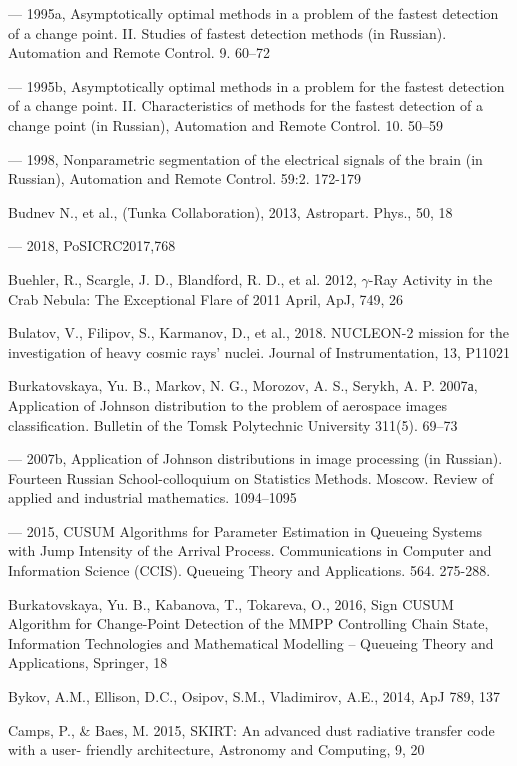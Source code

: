 --- 1995a, Asymptotically optimal methods in a problem of the fastest detection of a change point. II. Studies of fastest detection methods (in Russian). Automation and Remote Control. 9. 60--72

--- 1995b, Asymptotically optimal methods in a problem for the fastest detection of a change point. II. Characteristics of methods for the fastest detection of a change point (in Russian), Automation and Remote Control. 10. 50--59

--- 1998, Nonparametric segmentation of the electrical signals of the brain (in Russian), Automation and Remote Control. 59:2. 172-179

Budnev N., et al., (Tunka Collaboration), 2013, Astropart. Phys., 50, 18

--- 2018, PoSICRC2017,768

Buehler, R., Scargle, J. D., Blandford, R. D., et al. 2012, $\gamma$-Ray Activity in the Crab Nebula: The Exceptional Flare of 2011 April, ApJ, 749, 26

Bulatov, V., Filipov, S., Karmanov, D., et al., 2018. NUCLEON-2 mission for the investigation of heavy cosmic rays' nuclei. Journal of Instrumentation, 13, P11021

Burkatovskaya, Yu. B., Markov, N. G., Morozov, A. S., Serykh, A. P. 2007а, Application of Johnson distribution to the problem of aerospace images classification. Bulletin of the Tomsk Polytechnic University 311(5). 69--73

--- 2007b, Application of Johnson distributions in image processing (in Russian). Fourteen Russian School-colloquium on Statistics Methods. Moscow. Review of applied and industrial mathematics. 1094--1095

--- 2015, CUSUM Algorithms for Parameter Estimation in Queueing Systems with Jump Intensity of the Arrival Process. Communications in Computer and Information Science (CCIS). Queueing Theory and Applications. 564. 275-288.

Burkatovskaya, Yu. B., Kabanova, T., Tokareva, O., 2016, Sign CUSUM Algorithm for Change-Point Detection of the MMPP Controlling Chain State, Information Technologies and Mathematical Modelling -- Queueing Theory and Applications, Springer, 18

Bykov, A.M., Ellison, D.C., Osipov, S.M., Vladimirov, A.E., 2014, ApJ 789, 137

Camps, P., \& Baes, M. 2015, SKIRT: An advanced dust radiative transfer code with a user- friendly architecture, Astronomy and Computing, 9, 20

